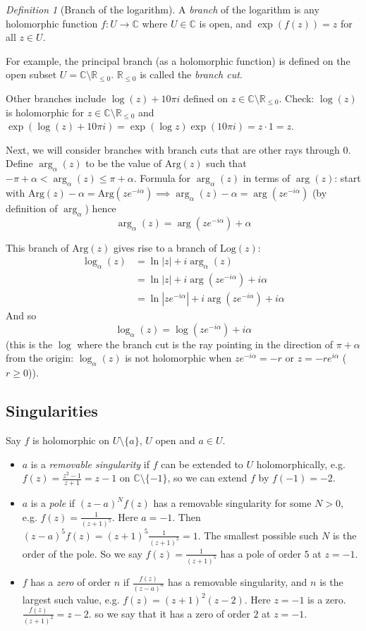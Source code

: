 \documentclass{article}
\theoremstyle{plain}
\theoremstyle{remark}
\newtheorem{definition}{Definition}
\newcommand{\R}{{\mathbb R}}
\newcommand{\C}{{\mathbb C}}
\begin{document}
\begin{definition}[Branch of the logarithm]
	A \emph{branch} of the logarithm is any holomorphic function
	$f \colon U \to \C$ where $U \in \C$ is open,
	and $\exp(f(z)) = z$ for all $z \in U$.
\end{definition}
For example, the principal branch (as a holomorphic function)
is defined on the open subset $U = \C \setminus \R_{\leq 0}$.
$\R_{\leq 0}$ is called the \emph{branch cut}.

Other branches include $\log(z) + 10 \pi i$ defined on $z \in \C \setminus\R_{\leq 0}$.
Check: $\log(z)$ is holomorphic for $z \in \C \setminus \R_{\leq 0}$
and $\exp(\log(z) + 10\pi i) = \exp(\log{z})\exp(10\pi i) = z \cdot 1 = z$.

Next, we will consider branches with branch cuts that are other rays through $0$.
Define $\arg_\alpha(z)$ to be the value of $\mathrm{Arg}(z)$ such that
$-\pi + \alpha < \arg_\alpha(z) \leq \pi + \alpha$.
Formula for $\arg_\alpha(z)$ in terms of $\arg(z)$:
start with $\mathrm{Arg}(z) - \alpha = \mathrm{Arg}(ze^{-i\alpha})
\implies \arg_\alpha(z) - \alpha = \arg(ze^{-i\alpha})$ (by definition of $\arg_\alpha$) hence
\[
	\arg_\alpha(z) = \arg(ze^{-i\alpha}) + \alpha
\]

This branch of $\mathrm{Arg}(z)$ gives rise to a branch of $\mathrm{Log}(z)$:
\begin{align*}
	\log_\alpha(z) &= \ln|z| + i\arg_\alpha(z)\\
				   &= \ln|z| + i\arg(ze^{-i\alpha}) + i\alpha\\
				   &= \ln|ze^{-i\alpha}| + i\arg(ze^{-i\alpha}) + i\alpha
\end{align*}
And so
\[
	\log_\alpha(z) = \log(ze^{-i\alpha}) + i\alpha
\]
(this is the $\log$ where the branch cut is the ray pointing in the direction of
$\pi + \alpha$ from the origin:
$\log_\alpha(z)$ is not holomorphic when $ze^{-i\alpha} = -r$
or $z = - re^{i\alpha}$ ($r \geq 0$)).

\subsection{Singularities}
Say $f$ is holomorphic on $U \setminus \{a\}$, $U$ open and $a \in U$.
\begin{itemize}
	\item $a$ is a \emph{removable singularity} if $f$ can be extended to $U$ holomorphically,
		e.g. $f(z) = \frac{z^2-1}{z+1}= z-1$ on $\C\setminus \{-1\}$,
		so we can extend $f$ by $f(-1) = -2$.
	\item $a$ is a \emph{pole} if $(z-a)^Nf(z)$ has a removable singularity
		for some $N > 0$,
		e.g. $f(z) = \frac{1}{(z+1)^5}$.
		Here $a = -1$.
		Then $(z-a)^5f(z) = (z+1)^5\frac{1}{(z+1)^5} = 1$.
		The smallest possible such $N$ is the order of the pole.
		So we say $f(z) = \frac{1}{(z+1)^5}$ has a pole of order $5$ at $z = -1$.
	\item $f$ has a \emph{zero} of order $n$ if $\frac{f(z)}{(z-a)^n}$
		has a removable singularity,
		and $n$ is the largest such value,
		e.g. $f(z) = (z+1)^2(z-2)$.
		Here $z = -1$ is a zero.
		$\frac{f(z)}{(z+1)^2} = z - 2$.
		so we say that it has a zero of order $2$ at $z = -1$.
\end{itemize}
\end{document}
